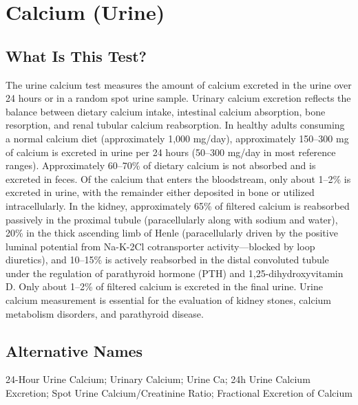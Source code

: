 \chapter{Calcium (Urine)}

\section*{What Is This Test?}
The urine calcium test measures the amount of calcium excreted in the urine over 24 hours or in a random spot urine sample. Urinary calcium excretion reflects the balance between dietary calcium intake, intestinal calcium absorption, bone resorption, and renal tubular calcium reabsorption. In healthy adults consuming a normal calcium diet (approximately 1,000 mg/day), approximately 150--300 mg of calcium is excreted in urine per 24 hours (50--300 mg/day in most reference ranges). Approximately 60--70\% of dietary calcium is not absorbed and is excreted in feces. Of the calcium that enters the bloodstream, only about 1--2\% is excreted in urine, with the remainder either deposited in bone or utilized intracellularly. In the kidney, approximately 65\% of filtered calcium is reabsorbed passively in the proximal tubule (paracellularly along with sodium and water), 20\% in the thick ascending limb of Henle (paracellularly driven by the positive luminal potential from Na-K-2Cl cotransporter activity---blocked by loop diuretics), and 10--15\% is actively reabsorbed in the distal convoluted tubule under the regulation of parathyroid hormone (PTH) and 1,25-dihydroxyvitamin D. Only about 1--2\% of filtered calcium is excreted in the final urine. Urine calcium measurement is essential for the evaluation of kidney stones, calcium metabolism disorders, and parathyroid disease.

\section*{Alternative Names}
24-Hour Urine Calcium; Urinary Calcium; Urine Ca; 24h Urine Calcium Excretion; Spot Urine Calcium/Creatinine Ratio; Fractional Excretion of Calcium

